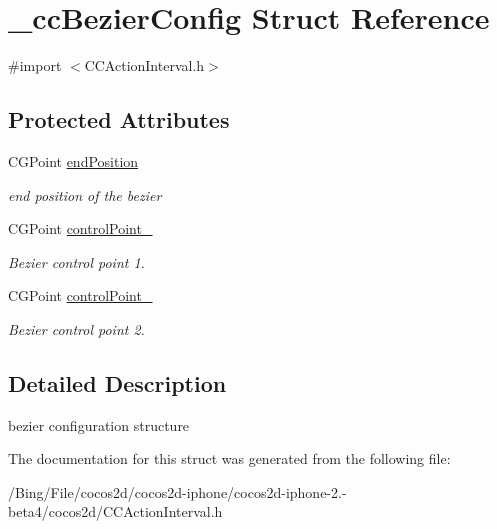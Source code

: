 \hypertarget{struct__cc_bezier_config}{\section{\-\_\-cc\-Bezier\-Config Struct Reference}
\label{struct__cc_bezier_config}
}


{\ttfamily \#import $<$C\-C\-Action\-Interval.\-h$>$}

\subsection*{Protected Attributes}
\begin{DoxyCompactItemize}
\item 
\hypertarget{struct__cc_bezier_config_a2bd61c0bb31be66157fc3081d6934645}{C\-G\-Point \hyperlink{struct__cc_bezier_config_a2bd61c0bb31be66157fc3081d6934645}{end\-Position}}\label{struct__cc_bezier_config_a2bd61c0bb31be66157fc3081d6934645}

\begin{DoxyCompactList}\small\item\em end position of the bezier \end{DoxyCompactList}\item 
\hypertarget{struct__cc_bezier_config_ac21875ed3c5bca510dbe37f96ef61bc7}{C\-G\-Point \hyperlink{struct__cc_bezier_config_ac21875ed3c5bca510dbe37f96ef61bc7}{control\-Point\-\_}}\label{struct__cc_bezier_config_ac21875ed3c5bca510dbe37f96ef61bc7}

\begin{DoxyCompactList}\small\item\em Bezier control point 1. \end{DoxyCompactList}\item 
\hypertarget{struct__cc_bezier_config_a0b528a7bf60a66f7094d4d139d895856}{C\-G\-Point \hyperlink{struct__cc_bezier_config_a0b528a7bf60a66f7094d4d139d895856}{control\-Point\-\_}}\label{struct__cc_bezier_config_a0b528a7bf60a66f7094d4d139d895856}

\begin{DoxyCompactList}\small\item\em Bezier control point 2. \end{DoxyCompactList}\end{DoxyCompactItemize}


\subsection{Detailed Description}
bezier configuration structure 

The documentation for this struct was generated from the following file\-:\begin{DoxyCompactItemize}
\item 
/\-Bing/\-File/cocos2d/cocos2d-\/iphone/cocos2d-\/iphone-\/2.-\/beta4/cocos2d/C\-C\-Action\-Interval.\-h\end{DoxyCompactItemize}
